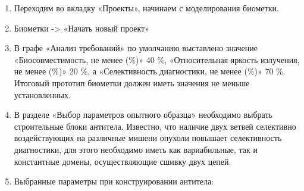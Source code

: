 \begin{enumerate}
    \item Переходим во вкладку «Проекты», начинаем с моделирования биометки.
    \item Биометки -> «Начать новый проект»
    \item В графе «Анализ требований» по умолчанию выставлено значение «Биосовместимость, не менее (\%)» 40 \%, «Относительная яркость излучения, не менее (\%)» 20 \%, а «Селективность диагностики, не менее (\%)» 70 \%. Итоговый прототип биометки должен иметь значения не меньше установленных.
    \item В разделе «Выбор параметров опытного образца» необходимо выбрать строительные блоки антитела. Известно, что наличие двух ветвей селективно воздействующих на различные мишени опухоли повышает селективность диагностики, для этого необходимо иметь как вариабильные, так и константные домены, осуществляющие сшивку двух цепей.
    \item Выбранные параметры при конструировании антитела:
    

\end{enumerate}
